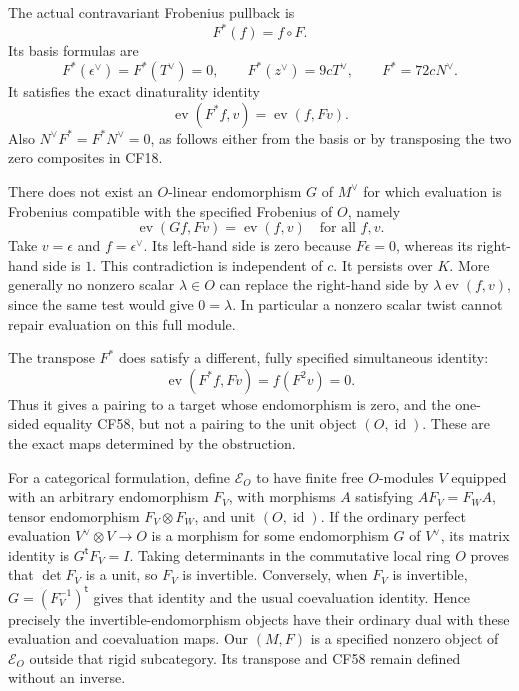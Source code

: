 The actual contravariant Frobenius pullback is
\[
 F^*(f)=f\circ F.
 \tag{CF56}
\]
Its basis formulas are
\[
 F^*(\epsilon^\vee)=F^*(T^\vee)=0,
 \qquad F^*(z^\vee)=9cT^\vee,
 \qquad F^*=72cN^\vee.
 \tag{CF57}
\]
It satisfies the exact dinaturality identity
\[
 \operatorname{ev}(F^*f,v)=\operatorname{ev}(f,Fv).
 \tag{CF58}
\]
Also \(N^\vee F^*=F^*N^\vee=0\), as follows either from the basis or by transposing the two zero composites in CF18.

There does not exist an \(O\)-linear endomorphism \(G\) of \(M^\vee\) for which evaluation is Frobenius compatible with the specified Frobenius of \(O\), namely
\[
 \operatorname{ev}(Gf,Fv)=\operatorname{ev}(f,v)
 \quad\text{for all }f,v.
 \tag{CF59}
\]
Take \(v=\epsilon\) and \(f=\epsilon^\vee\). Its left-hand side is zero because \(F\epsilon=0\), whereas its right-hand side is \(1\). This contradiction is independent of \(c\). It persists over \(K\). More generally no nonzero scalar \(\lambda\in O\) can replace the right-hand side by \(\lambda\operatorname{ev}(f,v)\), since the same test would give \(0=\lambda\). In particular a nonzero scalar twist cannot repair evaluation on this full module.

The transpose \(F^*\) does satisfy a different, fully specified simultaneous identity:
\[
 \operatorname{ev}(F^*f,Fv)=f(F^2v)=0.
 \tag{CF60}
\]
Thus it gives a pairing to a target whose endomorphism is zero, and the one-sided equality CF58, but not a pairing to the unit object \((O,\operatorname{id})\). These are the exact maps determined by the obstruction.

For a categorical formulation, define \(\mathcal E_O\) to have finite free \(O\)-modules \(V\) equipped with an arbitrary endomorphism \(F_V\), with morphisms \(A\) satisfying \(AF_V=F_WA\), tensor endomorphism \(F_V\otimes F_W\), and unit \((O,\operatorname{id})\). If the ordinary perfect evaluation \(V^\vee\otimes V\to O\) is a morphism for some endomorphism \(G\) of \(V^\vee\), its matrix identity is \(G^{\mathsf t}F_V=I\). Taking determinants in the commutative local ring \(O\) proves that \(\det F_V\) is a unit, so \(F_V\) is invertible. Conversely, when \(F_V\) is invertible, \(G=(F_V^{-1})^{\mathsf t}\) gives that identity and the usual coevaluation identity. Hence precisely the invertible-endomorphism objects have their ordinary dual with these evaluation and coevaluation maps. Our \((M,F)\) is a specified nonzero object of \(\mathcal E_O\) outside that rigid subcategory. Its transpose and CF58 remain defined without an inverse.

